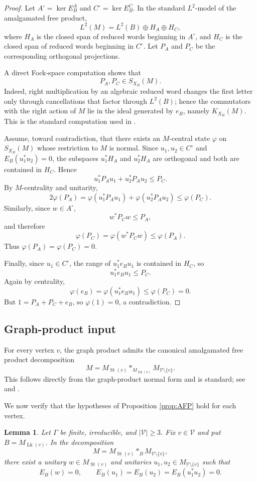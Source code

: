 \documentclass[12pt]{article}
\newtheorem{lemma}[theorem]{Lemma}
\theoremstyle{definition}
\newcommand{\V}{\mathcal V}
\newcommand{\Lk}{\operatorname{Lk}}
\newcommand{\St}{\operatorname{St}}
\newcommand{\freeprod}{\mathop{*}}
\begin{document}
\begin{proof}
Let $A^\circ=\ker E_B^A$ and $C^\circ=\ker E_B^C$.  In the standard $L^2$-model of the amalgamated free product,
\[
L^2(M)=L^2(B)\oplus H_A\oplus H_C,
\]
where $H_A$ is the closed span of reduced words beginning in $A^\circ$, and $H_C$ is the closed span of reduced words beginning in $C^\circ$.  Let $P_A$ and $P_C$ be the corresponding orthogonal projections.

A direct Fock-space computation shows that
\[
P_A,P_C\in S_{X_B}(M).
\]
Indeed, right multiplication by an algebraic reduced word changes the first letter only through cancellations that factor through $L^2(B)$; hence the commutators with the right action of $M$ lie in the ideal generated by $e_B$, namely $K_{X_B}(M)$.  This is the standard computation used in \cite[Section 6]{DKEP}.

Assume, toward contradiction, that there exists an $M$-central state $\varphi$ on $S_{X_B}(M)$ whose restriction to $M$ is normal.  Since $u_1,u_2\in C^\circ$ and $E_B(u_1^*u_2)=0$, the subspaces $u_1^*H_A$ and $u_2^*H_A$ are orthogonal and both are contained in $H_C$.  Hence
\[
u_1^*P_Au_1+u_2^*P_Au_2\leq P_C.
\]
By $M$-centrality and unitarity,
\[
2\varphi(P_A)
=
\varphi(u_1^*P_Au_1)+\varphi(u_2^*P_Au_2)
\leq \varphi(P_C).
\]
Similarly, since $w\in A^\circ$,
\[
w^*P_Cw\leq P_A,
\]
and therefore
\[
\varphi(P_C)=\varphi(w^*P_Cw)\leq \varphi(P_A).
\]
Thus $\varphi(P_A)=\varphi(P_C)=0$.

Finally, since $u_1\in C^\circ$, the range of $u_1^*e_Bu_1$ is contained in $H_C$, so
\[
u_1^*e_Bu_1\leq P_C.
\]
Again by centrality,
\[
\varphi(e_B)=\varphi(u_1^*e_Bu_1)\leq \varphi(P_C)=0.
\]
But $1=P_A+P_C+e_B$, so $\varphi(1)=0$, a contradiction.
\end{proof}

\subsection{Graph-product input}

For every vertex $v$, the graph product admits the canonical amalgamated free product decomposition
\[
M
=
M_{\St(v)}
\freeprod_{M_{\Lk(v)}}
M_{\V\setminus\{v\}}.
\]
This follows directly from the graph-product normal form and is standard; see \cite{CF} and \cite[Section 1.1]{CDHJKEN}.

We now verify that the hypotheses of Proposition \ref{prop:AFP} hold for each vertex.

\begin{lemma}\label{lem:unitaries}
Let $\Gamma$ be finite, irreducible, and $|\V|\geq 3$.  Fix $v\in\V$ and put $B=M_{\Lk(v)}$.  In the decomposition
\[
M
=
M_{\St(v)}
\freeprod_B
M_{\V\setminus\{v\}},
\]
there exist a unitary $w\in M_{\St(v)}$ and unitaries $u_1,u_2\in M_{\V\setminus\{v\}}$ such that
\[
E_B(w)=0,\qquad
E_B(u_1)=E_B(u_2)=E_B(u_1^*u_2)=0.
\]
\end{lemma}
\end{document}
